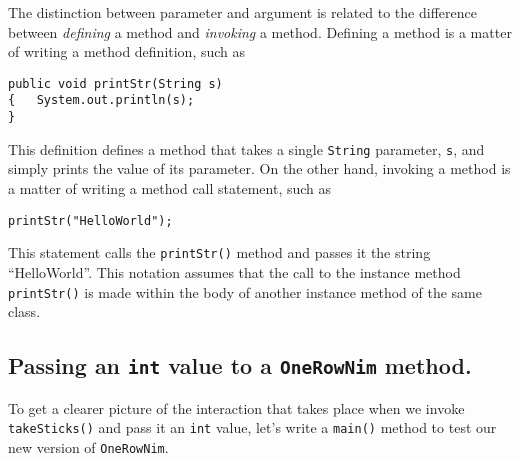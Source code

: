 
\noindent The distinction between parameter and argument is related
to the difference between {\it defining} a method and {\it invoking} a
method.  Defining a method is a matter of writing a method definition,
such as

\begin{jjjlisting}
\begin{lstlisting}
public void printStr(String s)
{   System.out.println(s);
}
\end{lstlisting}
\end{jjjlisting}

\noindent This definition defines a method that takes a
single {\tt String} parameter, {\tt s}, and simply prints the value of
its parameter.  On the other hand, invoking a method is a matter of
writing a method call statement, such as

\begin{jjjlisting}
\begin{lstlisting}
printStr("HelloWorld");
\end{lstlisting}
\end{jjjlisting}

\noindent This statement calls the {\tt printStr()} method and
passes it the string ``HelloWorld''.  This notation assumes that the
call to the instance method {\tt printStr()} is made within the body
of another instance method of the same class.

\subsection{Passing an {\tt int} value to a {\tt OneRowNim} method.}
\noindent To get a clearer picture of the interaction that takes place when we
invoke {\tt takeSticks()} and pass it an {\tt int} value, let's write a
{\tt main()} method to test our new version of {\tt OneRowNim}.

